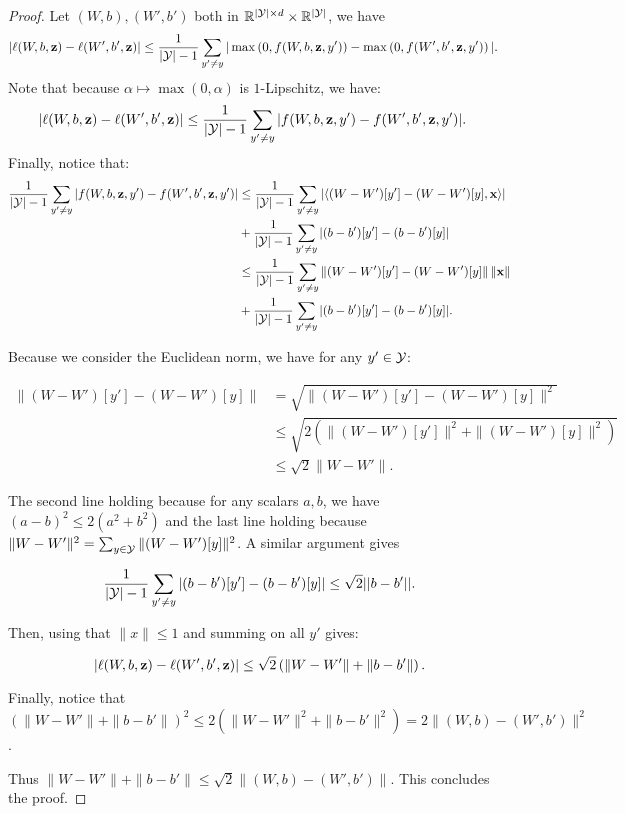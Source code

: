 \documentclass{article}
\begin{document}
\begin{proof}
    Let $(W,b),(W',b')$ both in $ \mathbb{R}^{|\mathcal{Y}|\times d}\times \mathbb{R}^{|\mathcal{Y}|}$, we have
    \begin{align*}
        |\ell(W,b,\mathbf{z})- \ell(W',b',\mathbf{z})| & \leq \frac{1}{|\mathcal{Y}|-1}\sum_{y^\prime \neq y} |\max\left(0, f(W,b,\mathbf{z},y') \right) - \max\left(0, f(W',b',\mathbf{z},y') \right)|.
    \end{align*}
    Note that because $\alpha\mapsto\max(0,\alpha)$ is $1$-Lipschitz, we have: 
    \begin{align*}
        |\ell(W,b,\mathbf{z})- \ell(W',b',\mathbf{z})| & \leq \frac{1}{|\mathcal{Y}|-1}\sum_{y^\prime \neq y} | f(W,b,\mathbf{z},y') - f(W',b',\mathbf{z},y')|.
    \end{align*}
    Finally, notice that: 
    \begin{align*}
        \frac{1}{|\mathcal{Y}|-1}\sum_{y^\prime \neq y} | f(W,b,\mathbf{z},y')  -f(W',b',\mathbf{z},y')| &\le \frac{1}{|\mathcal{Y}|-1}\sum_{y^\prime \neq y} \left|\left\langle (W-W')[y'] - (W-W')[y],\mathbf{x}\right\rangle   \right| \\
        & + \frac{1}{|\mathcal{Y}|-1}\sum_{y^\prime \neq y} |(b-b')[y'] - (b-b')[y]|\\
        & \leq \frac{1}{|\mathcal{Y}|-1}\sum_{y^\prime \neq y} \left\| (W-W')[y'] - (W-W')[y]  \right\|\|\mathbf{x}\| \\
        & + \frac{1}{|\mathcal{Y}|-1}\sum_{y^\prime \neq y} |(b-b')[y'] - (b-b')[y]|.
    \end{align*}


   Because we consider the Euclidean norm, we have for any $y'\in\mathcal{Y}$:

    \begin{align*}
        \left\| (W-W')[y'] - (W-W')[y]  \right\| & = \sqrt{\| (W-W')[y'] - (W-W')[y]\|^2} \\
        & \leq \sqrt{2 \left(\|(W-W')[y']\|^2 + \|(W-W')[y]\|^2 \right)} \\
        & \leq \sqrt{2}\|W-W'\|.
    \end{align*}

    The second line holding because for any scalars $a,b$, we have $(a-b)^2 \leq 2(a^2 + b^2)$ and the last line holding because $\|W-W'\|^2= \sum_{y\in\mathcal{Y}} \|(W-W')[y]\|^2$.
    A similar argument gives

    \[\frac{1}{|\mathcal{Y}|-1}\sum_{y^\prime \neq y} |(b-b')[y'] - (b-b')[y]| \leq \sqrt{2}||b-b'||.\]

    Then, using that $\|x\| \leq 1$ and summing on all $y'$ gives: 

    \[|\ell(W,b,\mathbf{z})- \ell(W',b',\mathbf{z})| \leq \sqrt{2}\left(\|W-W'\| + \|b-b'\|\right). \]

    Finally, notice that $(\|W-W'\| + \|b-b'\|)^2 \leq 2(\|W-W'\|^2 + \|b-b'\|^2) = 2\|(W,b)-(W',b')\|^2$. 

    Thus $\|W-W'\| + \|b-b'\| \leq \sqrt{2}\|(W,b)-(W',b')\|$. 
    This concludes the proof.
\end{proof}
\end{document}
